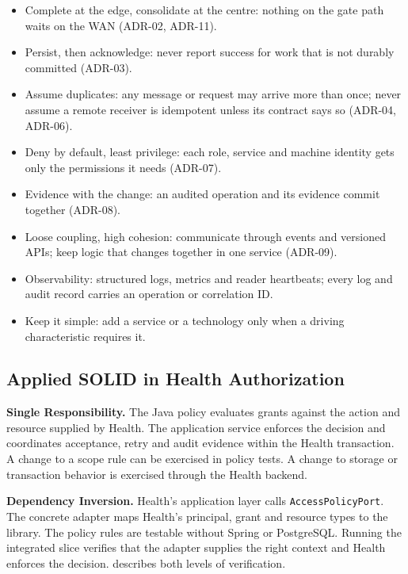 \begin{itemize}
  \item Complete at the edge, consolidate at the centre: nothing on the gate path waits on the WAN (ADR-02, ADR-11).
  \item Persist, then acknowledge: never report success for work that is not durably committed (ADR-03).
  \item Assume duplicates: any message or request may arrive more than once; never assume a remote receiver is idempotent unless its contract says so (ADR-04, ADR-06).
  \item Deny by default, least privilege: each role, service and machine identity gets only the permissions it needs (ADR-07).
  \item Evidence with the change: an audited operation and its evidence commit together (ADR-08).
  \item Loose coupling, high cohesion: communicate through events and versioned APIs; keep logic that changes together in one service (ADR-09).
  \item Observability: structured logs, metrics and reader heartbeats; every log and audit record carries an operation or correlation ID.
  \item Keep it simple: add a service or a technology only when a driving characteristic requires it.
\end{itemize}

\subsection{Applied SOLID in Health Authorization}\label{sec:m2-health-solid}

\textbf{Single Responsibility.} The Java policy evaluates grants against
the action and resource supplied by Health. The application service
enforces the decision and coordinates acceptance, retry and audit
evidence within the Health transaction. A change to a scope rule can
be exercised in policy tests. A change to storage or transaction
behavior is exercised through the Health backend.

\textbf{Dependency Inversion.} Health's application layer calls
\texttt{AccessPolicyPort}. The concrete adapter maps Health's principal,
grant and resource types to the library. The policy rules are testable
without Spring or PostgreSQL. Running the integrated slice verifies
that the adapter supplies the right context and Health enforces the
decision.  describes both
levels of verification.

